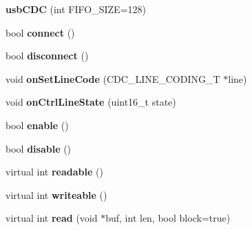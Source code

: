 \begin{DoxyCompactItemize}
\item 
\hypertarget{classusb_c_d_c_a6eb4d9401ac17bab0bfb869bf6fc6315}{{\bfseries usb\-C\-D\-C} (int F\-I\-F\-O\-\_\-\-S\-I\-Z\-E=128)}\label{classusb_c_d_c_a6eb4d9401ac17bab0bfb869bf6fc6315}

\item 
\hypertarget{classusb_c_d_c_a49d431de50da7ccacf91ef33b04e99d2}{bool {\bfseries connect} ()}\label{classusb_c_d_c_a49d431de50da7ccacf91ef33b04e99d2}

\item 
\hypertarget{classusb_c_d_c_aa95f819926a8da40f12eebc62adf6f95}{bool {\bfseries disconnect} ()}\label{classusb_c_d_c_aa95f819926a8da40f12eebc62adf6f95}

\item 
\hypertarget{classusb_c_d_c_a15d235836f03a59a8d3a12ad5df78cd7}{void {\bfseries on\-Set\-Line\-Code} (C\-D\-C\-\_\-\-L\-I\-N\-E\-\_\-\-C\-O\-D\-I\-N\-G\-\_\-\-T $\ast$line)}\label{classusb_c_d_c_a15d235836f03a59a8d3a12ad5df78cd7}

\item 
\hypertarget{classusb_c_d_c_ad20e467624da633a79b150a435667619}{void {\bfseries on\-Ctrl\-Line\-State} (uint16\-\_\-t state)}\label{classusb_c_d_c_ad20e467624da633a79b150a435667619}

\item 
\hypertarget{classusb_c_d_c_a806fa3a4be9e6cfaab51b8621cb70697}{bool {\bfseries enable} ()}\label{classusb_c_d_c_a806fa3a4be9e6cfaab51b8621cb70697}

\item 
\hypertarget{classusb_c_d_c_a7ded774547bd49ca5f73257914a1f1f9}{bool {\bfseries disable} ()}\label{classusb_c_d_c_a7ded774547bd49ca5f73257914a1f1f9}

\item 
\hypertarget{classusb_c_d_c_a7182c4dfdad0293bba73a82056d43e80}{virtual int {\bfseries readable} ()}\label{classusb_c_d_c_a7182c4dfdad0293bba73a82056d43e80}

\item 
\hypertarget{classusb_c_d_c_ae45acb09392fedde912a5dba6fc3b88a}{virtual int {\bfseries writeable} ()}\label{classusb_c_d_c_ae45acb09392fedde912a5dba6fc3b88a}

\item 
\hypertarget{classusb_c_d_c_a65831ad4bfa85bf83f467c63b9f22799}{virtual int {\bfseries read} (void $\ast$buf, int len, bool block=true)}\label{classusb_c_d_c_a65831ad4bfa85bf83f467c63b9f22799}


\end{DoxyCompactItemize}

